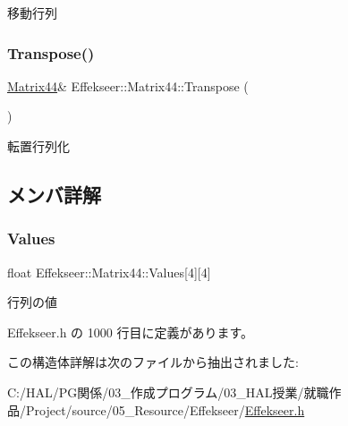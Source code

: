 移動行列 

\mbox{\label{struct_effekseer_1_1_matrix44_a9feeb08ed8858074e9bf433244ace76e}} 
\subsubsection{\texorpdfstring{Transpose()}{Transpose()}}
{\footnotesize\ttfamily \mbox{\hyperlink{struct_effekseer_1_1_matrix44}{Matrix44}}\& Effekseer\+::\+Matrix44\+::\+Transpose (\begin{DoxyParamCaption}{ }\end{DoxyParamCaption})}



転置行列化 



\subsection{メンバ詳解}
\mbox{\label{struct_effekseer_1_1_matrix44_ac747413302e165521317a399db929313}} 
\subsubsection{\texorpdfstring{Values}{Values}}
{\footnotesize\ttfamily float Effekseer\+::\+Matrix44\+::\+Values\mbox{[}4\mbox{]}\mbox{[}4\mbox{]}}



行列の値 



 Effekseer.\+h の 1000 行目に定義があります。



この構造体詳解は次のファイルから抽出されました\+:\begin{DoxyCompactItemize}
\item 
C\+:/\+H\+A\+L/\+P\+G関係/03\+\_\+作成プログラム/03\+\_\+\+H\+A\+L授業/就職作品/\+Project/source/05\+\_\+\+Resource/\+Effekseer/\mbox{\hyperlink{_effekseer_8h}{Effekseer.\+h}}\end{DoxyCompactItemize}
